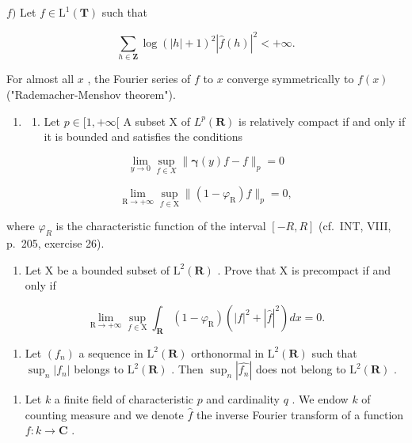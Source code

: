 \(f)\) Let \(f\in \mathrm{L}^1 (\mathbf{T})\) such that

\[
\sum_ {h \in \mathbf {Z}} \log (| h | + 1) ^ {2} | \widehat {f} (h) | ^ {2} <   + \infty .
\]

For almost all \(x\) , the Fourier series of \(f\) to \(x\) converge symmetrically to \(f(x)\) ("Rademacher-Menshov theorem").

\begin{enumerate}
\def\labelenumi{\arabic{enumi})}
\setcounter{enumi}{47}
\tightlist
\item
  \begin{enumerate}
  \def\labelenumii{\alph{enumii})}
  \tightlist
  \item
    Let \(p \in [1, +\infty[\) A subset X of \(L^p(\mathbf{R})\) is relatively compact if and only if it is bounded and satisfies the conditions
  \end{enumerate}
\end{enumerate}

\[
\lim _ {y \to 0} \sup _ {f \in X} \| \boldsymbol {\gamma} (y) f - f \| _ {p} = 0
\]

\[
\lim _ {\mathrm{R} \to + \infty} \sup _ {f \in \mathrm{X}} \| (1 - \varphi_ {\mathrm{R}}) f \| _ {p} = 0,
\]

where \(\varphi_{R}\) is the characteristic function of the interval \([-R,R]\) (cf.~INT, VIII, p.~205, exercise 26).

\begin{enumerate}
\def\labelenumi{\alph{enumi})}
\setcounter{enumi}{1}
\tightlist
\item
  Let X be a bounded subset of \(\mathrm{L}^{2}(\mathbf{R})\) . Prove that X is precompact if and only if
\end{enumerate}

\[
\lim _ {\mathrm{R} \to + \infty} \sup _ {f \in \mathrm{X}} \int_ {\mathbf {R}} (1 - \varphi_ {\mathrm{R}}) (| f | ^ {2} + | \widehat {f} | ^ {2}) d x = 0.
\]

\begin{enumerate}
\def\labelenumi{\alph{enumi})}
\setcounter{enumi}{2}
\tightlist
\item
  Let \((f_{n})\) a sequence in \(\mathrm{L}^{2}(\mathbf{R})\) orthonormal in \(\mathrm{L}^{2}(\mathbf{R})\) such that \(\sup_{n}|f_{n}|\) belongs to \(\mathrm{L}^{2}(\mathbf{R})\) . Then \(\sup_{n}|\widehat{f_{n}}|\) does not belong to \(\mathrm{L}^{2}(\mathbf{R})\) .
\end{enumerate}

\begin{enumerate}
\def\labelenumi{\arabic{enumi})}
\setcounter{enumi}{48}
\tightlist
\item
  Let \(k\) a finite field of characteristic \(p\) and cardinality \(q\) . We endow \(k\) of counting measure and we denote \(\widehat{f}\) the inverse Fourier transform of a function \(f: k \to \mathbf{C}\) .
\end{enumerate}


